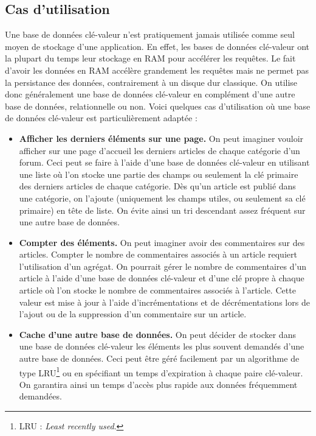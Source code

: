 \subsection{Cas d'utilisation}
	Une base de données clé-valeur n'est pratiquement jamais utilisée comme seul moyen de stockage d'une application. En effet, les bases de données clé-valeur ont la plupart du temps leur stockage en RAM pour accélérer les requêtes. Le fait d'avoir les données en RAM accélère grandement les requêtes mais ne permet pas la persistance des données, contrairement à un disque dur classique. On utilise donc généralement une base de données clé-valeur en complément d'une autre base de données, relationnelle ou non. Voici quelques cas d'utilisation où une base de données clé-valeur est particulièrement adaptée :
	\vspace{10px}
	\begin{itemize}
	 	\item \textbf{Afficher les derniers éléments sur une page.} On peut imaginer vouloir afficher sur une page d'accueil les derniers articles de chaque catégorie d'un forum. Ceci peut se faire à l'aide d'une base de données clé-valeur en utilisant une liste où l'on stocke une partie des champs ou seulement la clé primaire des derniers articles de chaque catégorie. Dès qu'un article est publié dans une catégorie, on l'ajoute (uniquement les champs utiles, ou seulement sa clé primaire) en tête de liste. On évite ainsi un tri descendant assez fréquent sur une autre base de données.
	 	\item \textbf{Compter des éléments.} On peut imaginer avoir des commentaires sur des articles. Compter le nombre de commentaires associés à un article requiert l'utilisation d'un agrégat. On pourrait gérer le nombre de commentaires d'un article à l'aide d'une base de données clé-valeur et d'une clé propre à chaque article où l'on stocke le nombre de commentaires associés à l'article. Cette valeur est mise à jour à l'aide d'incrémentations et de décrémentations lors de l'ajout ou de la suppression d'un commentaire sur un article.
	 	\item \textbf{Cache d'une autre base de données.} On peut décider de stocker dans une base de données clé-valeur les éléments les plus souvent demandés d'une autre base de données. Ceci peut être géré facilement par un algorithme de type LRU\footnote{LRU : \textit{Least recently used}.} ou en spécifiant un temps d'expiration à chaque paire clé-valeur. On garantira ainsi un temps d'accès plus rapide aux données fréquemment demandées.

\end{itemize}
